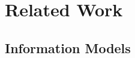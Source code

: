 \chapter{Related Work}
\label{chap:relatedWork}
\minitoc


\section{Information Models}
\label{sec:InformationModels}
